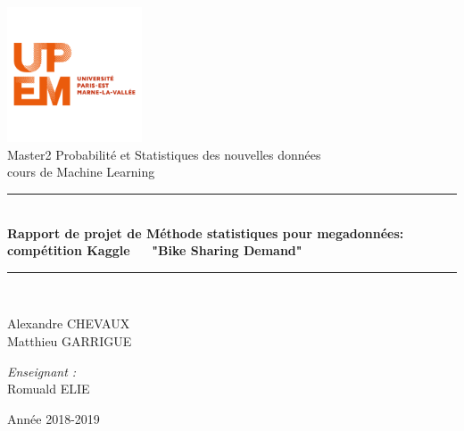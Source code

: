 \documentclass[a4paper,oneside,11pt]{article}
\date{}
\begin{document}
\hypersetup{pdfborder=0 0 0}
\begin{titlepage}
\begin{center}

\includegraphics[width=0.3\textwidth]{image_rapport/Logo_UPEM}\\[1cm]

{\large Master2 Probabilité et Statistiques des nouvelles données}\\[0.5cm]

{\large cours de Machine Learning}\\[2cm]

\rule{\linewidth}{1mm} \\[0.4cm]
{ \huge \bfseries Rapport de projet de Méthode statistiques pour megadonnées: compétition Kaggle $\quad$
"Bike Sharing Demand" \\[0.4cm] }
\rule{\linewidth}{1mm} \\[3cm]

\noindent
\begin{minipage}{0.4\textwidth}
  \begin{flushleft} \large
    Alexandre \textsc{CHEVAUX}\\
    Matthieu \textsc{GARRIGUE}\\
  \end{flushleft}
\end{minipage}%
\begin{minipage}{0.4\textwidth}
  \begin{flushright} \large
    \emph{Enseignant :} \\
    Romuald \textsc{ELIE}\\
  \end{flushright}
\end{minipage}

\vfill

{\large Année 2018-2019}

\end{center}
\end{titlepage}
\setcounter{tocdepth}{3}
\tableofcontents
\newpage
\end{document}
